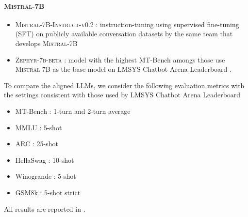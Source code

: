 \paragraph{\textsc{Mistral-7B}}
\begin{itemize}
    \item \textsc{Mistral-7B-Instruct-v0.2} \citep{jiang2023mistral7b}: instruction-tuning using supervised fine-tuning (SFT) on publicly available conversation datasets by the same team that develops \textsc{Mistral-7B}
    \item \textsc{Zephyr-7b-beta} \citep{tunstall2023zephyrdirect}: model with the highest MT-Bench amongs those use \textsc{Mistral-7B} as the base model on LMSYS Chatbot Arena Leaderboard \citep{mtbench}. 
\end{itemize}
To compare the aligned LLMs, we consider the following evaluation metrics with the settings consistent with those used by LMSYS Chatbot Arena Leaderboard \citep{mtbench}
\begin{itemize}
    \item MT-Bench \citep{mtbench}: 1-turn and 2-turn average
    \item MMLU \citep{mmlu}: 5-shot
    \item ARC \citep{clark2018thinkyou}: 25-shot
    \item HellaSwag \citep{zellers2019hellaswagcan}: 10-shot
    \item Winogrande \citep{sakaguchi2019winograndeadversarial}: 5-shot
    \item GSM8k \citep{cobbe2021trainingverifiers}: 5-shot strict 
\end{itemize}
All results are reported in .
